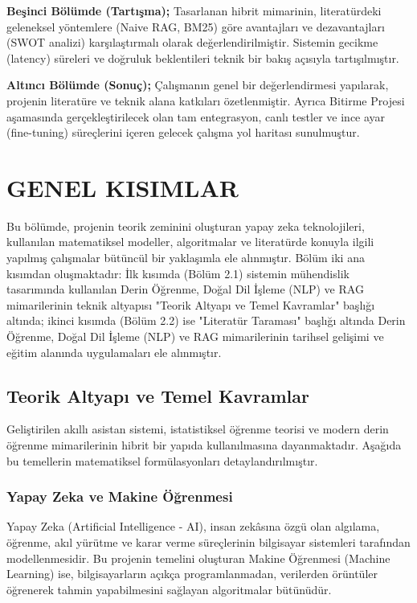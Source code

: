 \documentclass[12pt,a4paper]{report}
\begin{document}
\textbf{Beşinci Bölümde (Tartışma);} Tasarlanan hibrit mimarinin, literatürdeki geleneksel yöntemlere (Naive RAG, BM25) göre avantajları ve dezavantajları (SWOT analizi) karşılaştırmalı olarak değerlendirilmiştir. Sistemin gecikme (latency) süreleri ve doğruluk beklentileri teknik bir bakış açısıyla tartışılmıştır.

\textbf{Altıncı Bölümde (Sonuç);} Çalışmanın genel bir değerlendirmesi yapılarak, projenin literatüre ve teknik alana katkıları özetlenmiştir. Ayrıca Bitirme Projesi aşamasında gerçekleştirilecek olan tam entegrasyon, canlı testler ve ince ayar (fine-tuning) süreçlerini içeren gelecek çalışma yol haritası sunulmuştur.

\chapter{GENEL KISIMLAR}

Bu bölümde, projenin teorik zeminini oluşturan yapay zeka teknolojileri, kullanılan matematiksel modeller, algoritmalar ve literatürde konuyla ilgili yapılmış çalışmalar bütüncül bir yaklaşımla ele alınmıştır. Bölüm iki ana kısımdan oluşmaktadır: İlk kısımda (Bölüm 2.1) sistemin mühendislik tasarımında kullanılan Derin Öğrenme, Doğal Dil İşleme (NLP) ve RAG mimarilerinin teknik altyapısı "Teorik Altyapı ve Temel Kavramlar" başlığı altında; ikinci kısımda (Bölüm 2.2) ise "Literatür Taraması" başlığı altında Derin Öğrenme, Doğal Dil İşleme (NLP) ve RAG mimarilerinin tarihsel gelişimi ve eğitim alanında uygulamaları ele alınmıştır.

\section{Teorik Altyapı ve Temel Kavramlar}

Geliştirilen akıllı asistan sistemi, istatistiksel öğrenme teorisi ve modern derin öğrenme mimarilerinin hibrit bir yapıda kullanılmasına dayanmaktadır. Aşağıda bu temellerin matematiksel formülasyonları detaylandırılmıştır.

\subsection{Yapay Zeka ve Makine Öğrenmesi}
Yapay Zeka (Artificial Intelligence - AI), insan zekâsına özgü olan algılama, öğrenme, akıl yürütme ve karar verme süreçlerinin bilgisayar sistemleri tarafından modellenmesidir. Bu projenin temelini oluşturan Makine Öğrenmesi (Machine Learning) ise, bilgisayarların açıkça programlanmadan, verilerden örüntüler öğrenerek tahmin yapabilmesini sağlayan algoritmalar bütünüdür.
\end{document}

